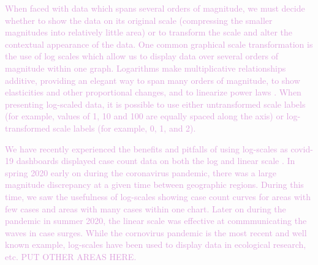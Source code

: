 \documentclass[]{interact}
\theoremstyle{plain}%
\theoremstyle{definition}
\theoremstyle{remark}
\begin{document}
\textcolor{Plum}{
When faced with data which spans several orders of magnitude, we must decide whether to show the data on its original scale (compressing the smaller magnitudes into relatively little area) or to transform the scale and alter the contextual appearance of the data.
One common graphical scale transformation is the use of log scales which allow us to display data over several orders of magnitude within one graph. 
Logarithms make multiplicative relationships additive, providing an elegant way to span many orders of magnitude, to show elasticities and other proportional changes, and to linearize power laws \citep{menge_logarithmic_2018}. 
When presenting log-scaled data, it is possible to use either untransformed scale labels (for example, values of 1, 10 and 100 are equally spaced along the axis) or log-transformed scale labels (for example, 0, 1, and 2).}

\textcolor{Plum}{We have recently experienced the benefits and pitfalls of using log-scales as covid-19 dashboards displayed case count data on both the log and linear scale \citep{wade_fagen_ulmschneider_2020}. 
In spring 2020 early on during the coronavirus pandemic, there was a large magnitude discrepancy at a given time between geographic regions. 
During this time, we saw the usefulness of log-scales showing case count curves for areas with few cases and areas with many cases within one chart. 
Later on during the pandemic in summer 2020, the linear scale was effective at commmunicating the waves in case surges.
While the cornovirus pandemic is the most recent and well known example, log-scales have been used to display data in ecological research, etc. 
PUT OTHER AREAS HERE.
}
\end{document}
